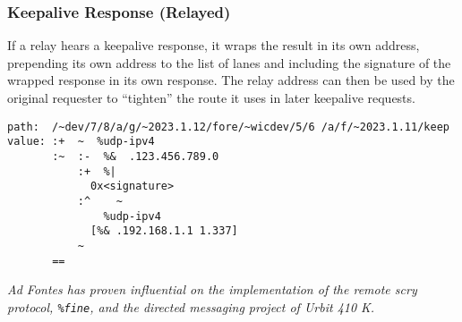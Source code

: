 \documentclass[twoside]{article}
\begin{document}
\subsubsection{Keepalive Response (Relayed)}

If a relay hears a keepalive response, it wraps the result in its own address, prepending its own address to the list of lanes and including the signature of the wrapped response in its own response. The relay address can then be used by the original requester to ``tighten'' the route it uses in later keepalive requests.

\begin{lstlisting}[style=listingcode]
path:  /~dev/7/8/a/g/~2023.1.12/fore/~wicdev/5/6 /a/f/~2023.1.11/keep
value: :+  ~  %udp-ipv4
       :~  :-  %&  .123.456.789.0
           :+  %|
             0x<signature>
           :^    ~
               %udp-ipv4
             [%& .192.168.1.1 1.337]
           ~
       ==
\end{lstlisting}

\noindent
\emph{Ad Fontes has proven influential on the implementation of the remote scry protocol, \texttt{\%fine}, and the directed messaging project of Urbit 410 K.}\tombstone{}

\printbibliography
\end{document}
